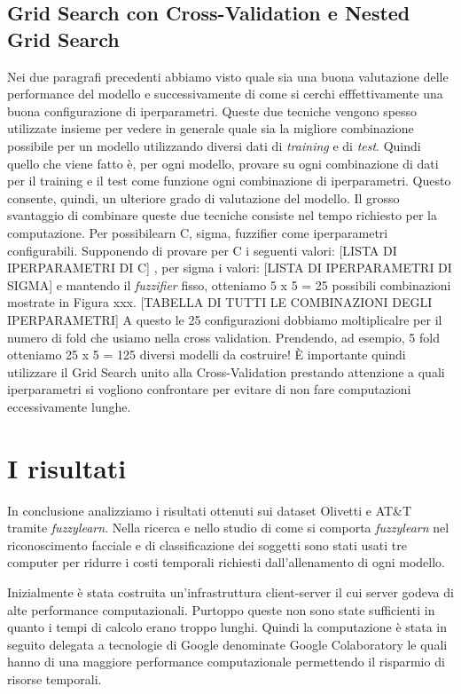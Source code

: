 \documentclass[12pt,italian]{report}
\begin{document}
\subsection{Grid Search con Cross-Validation e Nested Grid Search}
Nei due paragrafi precedenti abbiamo visto quale sia una buona valutazione delle performance del modello e successivamente di come si cerchi efffettivamente una buona configurazione di iperparametri. Queste due tecniche vengono spesso utilizzate insieme per vedere in generale quale sia la migliore combinazione possibile per un modello utilizzando diversi dati di \emph{training} e di \emph{test}.
Quindi quello che viene fatto è, per ogni modello, provare su ogni combinazione di dati per il training e il test come funzione ogni combinazione di iperparametri. Questo consente, quindi, un ulteriore grado di valutazione del modello. Il grosso svantaggio di combinare queste due tecniche consiste nel tempo richiesto per la computazione. Per possibilearn C, sigma, fuzzifier come iperparametri configurabili. Supponendo di provare per C i seguenti valori:
[LISTA DI IPERPARAMETRI DI C]
, per sigma i valori: 
[LISTA DI IPERPARAMETRI DI SIGMA]
e mantendo il \emph{fuzzifier} fisso, otteniamo 5 x 5 = 25 possibili combinazioni mostrate in Figura xxx. 
[TABELLA DI TUTTI LE COMBINAZIONI DEGLI IPERPARAMETRI]
A questo le 25 configurazioni dobbiamo moltiplicalre per il numero di fold che usiamo nella cross validation. Prendendo, ad esempio, 5 fold otteniamo 25 x 5 = 125 diversi modelli da costruire!
È importante quindi utilizzare il Grid Search unito alla Cross-Validation prestando attenzione a quali iperparametri si vogliono confrontare per evitare di non fare computazioni eccessivamente lunghe.


\section{I risultati}
In conclusione analizziamo i risultati ottenuti sui dataset Olivetti e AT\&T tramite \emph{fuzzylearn}. Nella ricerca e nello studio di come si comporta \emph{fuzzylearn} nel riconoscimento facciale e di classificazione dei soggetti sono stati usati tre computer per ridurre i costi temporali richiesti dall'allenamento di ogni modello. %

Inizialmente è stata costruita un'infrastruttura client-server il cui server godeva di alte performance computazionali. Purtoppo queste non sono state sufficienti in quanto i tempi di calcolo erano troppo lunghi. Quindi la computazione è stata in seguito delegata a tecnologie di Google denominate Google Colaboratory le quali hanno di una maggiore performance computazionale permettendo il risparmio di risorse temporali.
\end{document}
